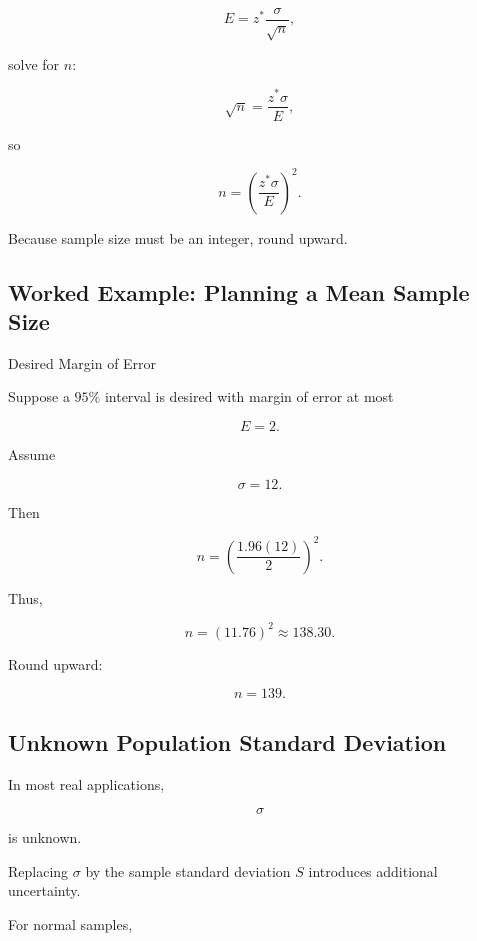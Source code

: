 \[
E
=
z^*
\frac{\sigma}{\sqrt{n}},
\]

solve for \(n\):

\[
\sqrt{n}
=
\frac{
z^*\sigma
}{E},
\]

so

\[
\boxed{
n
=
\left(
\frac{
z^*\sigma
}{E}
\right)^2.
}
\]

Because sample size must be an integer, round upward.

\subsection{Worked Example: Planning a Mean Sample Size}
\label{subsec:worked-sample-size-mean}

\begin{workedexamplebox}{Desired Margin of Error}

Suppose a \(95\%\) interval is desired with margin of error at most

\[
E=2.
\]

Assume

\[
\sigma=12.
\]

Then

\[
n
=
\left(
\frac{
1.96(12)
}{2}
\right)^2.
\]

Thus,

\[
n
=
(11.76)^2
\approx
138.30.
\]

Round upward:

\begin{answerbox}
\[
\boxed{
n=139.
}
\]
\end{answerbox}

\end{workedexamplebox}

\subsection{Unknown Population Standard Deviation}
\label{subsec:unknown-sigma-ci}

In most real applications,

\[
\sigma
\]

is unknown.

Replacing \(\sigma\) by the sample standard deviation \(S\) introduces
additional uncertainty.

For normal samples,

